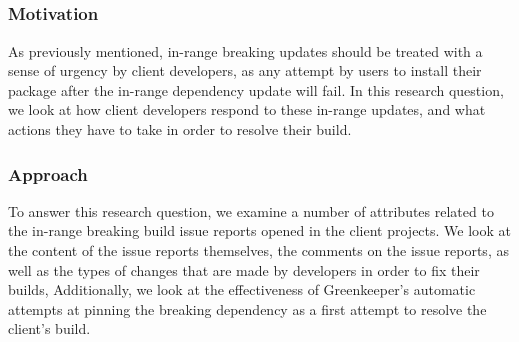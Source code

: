 \subsection{\rqtwo}
\label{sec:results:rq2}
\subsubsection{Motivation}
As previously mentioned, in-range breaking updates should be treated with a sense of urgency by client developers, as any attempt by users to install their package after the in-range dependency update will fail. In this research question, we look at how client developers respond to these in-range updates, and what actions they have to take in order to resolve their build.

\subsubsection{Approach}
To answer this research question, we examine a number of attributes related to the in-range breaking build issue reports opened in the client projects. We look at the content of the issue reports themselves, the comments on the issue reports, as well as the types of changes that are made by developers in order to fix their builds, Additionally, we look at the effectiveness of Greenkeeper's automatic attempts at pinning the breaking dependency as a first attempt to resolve the client's build.


